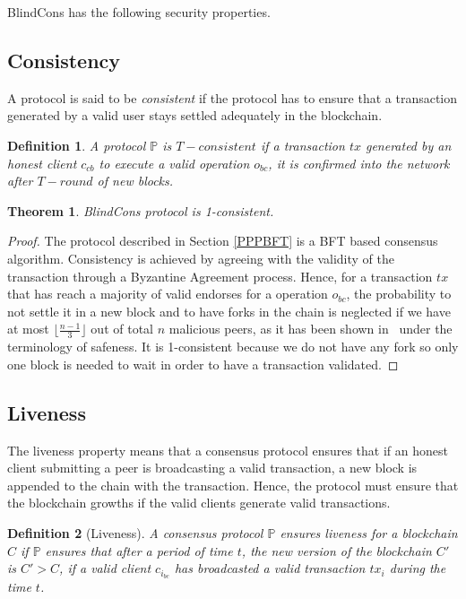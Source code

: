 \documentclass[conference]{IEEEtran}
\newcommand{\name}{BlindCons}
\newtheorem{definition}{Definition}
\newtheorem{theorem}{Theorem}
\newtheorem{proof}{Proof}
\begin{document}
\name{} has the following security properties.

\subsection{Consistency}
A protocol is said to be \emph{consistent} if the protocol has  to ensure that a transaction generated by a valid user stays settled adequately in the blockchain.

\begin{definition}
A protocol $\mathbb{P}$ is $T-consistent$ if a transaction $tx$ generated by an honest client $c_{cb}$ to execute a valid operation $o_{bc}$, it is confirmed into the network after $T-round$ of new blocks.
\end{definition}

\begin{theorem} \name{} protocol is 1-consistent.
\end{theorem}

\begin{proof}
The protocol described in Section \ref{PPPBFT} is a BFT based consensus algorithm. Consistency is achieved by agreeing with the validity of the transaction through a Byzantine Agreement process. Hence, for a transaction $tx$ that has reach a majority of valid endorses for a operation $o_{bc}$, the probability to not settle it in a new block and to have forks in the chain is neglected if we have at most $\lfloor\frac{n-1}{3}\rfloor$ out of total $n$ malicious peers, as it has been shown in~\cite{castro1999practical,li2007beyond} under the terminology of safeness. It is 1-consistent because we do not have any fork so only  one block is needed to wait in order to have a transaction validated.
\end{proof}

\subsection{Liveness}

The liveness property means that a consensus protocol ensures that if an honest client  submitting a peer is broadcasting a valid transaction, a new block is appended to the chain with the transaction. Hence, the protocol must ensure that the blockchain  growths if the valid clients generate valid transactions.

\begin{definition}[Liveness]
A consensus protocol $\mathbb{P}$ ensures \emph{liveness for a blockchain $C$} if $\mathbb{P}$ ensures that after a period of time $t$, the new version of the blockchain $C'$ is $C' > C$, if a valid client $c_{i_{bc}}$ has broadcasted a valid transaction $tx_i$ during the time $t$. 
\end{definition}
\end{document}
